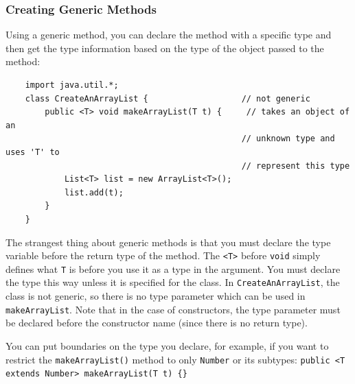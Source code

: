 \subsubsection{Creating Generic Methods}
Using a generic method, you can declare the method with a specific type and 
then get the type information based on the type of the object passed to the 
method:
\begin{verbatim}
    import java.util.*;
    class CreateAnArrayList {                   // not generic
        public <T> void makeArrayList(T t) {     // takes an object of an
                                                // unknown type and uses 'T' to
                                                // represent this type
            List<T> list = new ArrayList<T>();
            list.add(t);
        }
    }
\end{verbatim}

The strangest thing about generic methods is that you must declare the type 
variable before the return type of the method. The \verb#<T># before 
\verb#void# simply defines what \verb#T# is before you use it as a type in the 
argument. You must declare the type this way unless it is specified for the 
class. In \verb#CreateAnArrayList#, the class is not generic, so there is no 
type parameter which can be used in \verb#makeArrayList#. Note that in the case 
of constructors, the type parameter must be declared before the constructor 
name (since there is no return type).

You can put boundaries on the type you declare, for example, if you want to 
restrict the \verb#makeArrayList()# method to only \verb#Number# or its 
subtypes: \verb#public <T extends Number> makeArrayList(T t) {}#
